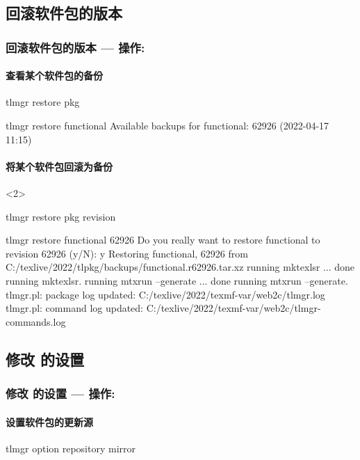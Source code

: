 \subsection{回滚软件包的版本}

\begin{frame}[fragile]
  \frametitle{回滚软件包的版本 --- 操作: }
  
  \framesubtitle<1>{查看某个软件包的备份} 
\begin{cmdcode}
tlmgr restore pkg
\end{cmdcode}
\begin{outputcode}
tlmgr restore functional
Available backups for functional: 62926 (2022-04-17 11:15)
\end{outputcode}
  \framesubtitle<2>{将某个软件包回滚为备份}

\begin{uncoverenv}<2>
\begin{cmdcode}
tlmgr restore pkg revision
\end{cmdcode}
\begin{outputcode}
tlmgr restore functional 62926
Do you really want to restore functional to revision 62926 (y/N): y
Restoring functional, 62926 from C:/texlive/2022/tlpkg/backups/functional.r62926.tar.xz
running mktexlsr ...
done running mktexlsr.
running mtxrun --generate ...
done running mtxrun --generate.
tlmgr.pl: package log updated: C:/texlive/2022/texmf-var/web2c/tlmgr.log
tlmgr.pl: command log updated: C:/texlive/2022/texmf-var/web2c/tlmgr-commands.log
\end{outputcode}
\end{uncoverenv}
\end{frame}

\subsection{修改 \texorpdfstring{\tlmgr}{tlmgr} 的设置}

\begin{frame}[fragile]
  \frametitle{修改 \tlmgr 的设置 --- 操作: }
  \framesubtitle{设置软件包的更新源}
\begin{cmdcode}
tlmgr option repository mirror
\end{cmdcode}
\end{frame}

